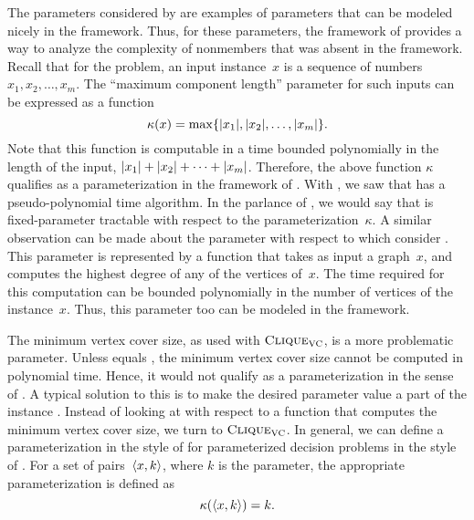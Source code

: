 The parameters considered by \citeauthor{garey1979computers} are examples of parameters that can be modeled nicely in the \citeauthor{flum2006parameterized} framework.
Thus, for these parameters, the framework of \citeauthor{flum2006parameterized} provides a way to analyze the complexity of nonmembers that was absent in the \citeauthor{downey1999parameterized} framework.
Recall that for the  problem, an input instance~$x$ is a sequence of numbers $x_1, x_2, \ldots, x_m$.
The \enquote{maximum component length} parameter for such inputs can be expressed as a function
\begin{equation*}
  \kappa(x) = \max \{{\lvert x_1\rvert}, {\lvert x_2\rvert}, \ldots, {\lvert x_m\rvert}\}.
\end{equation*}
Note that this function is computable in a time bounded polynomially in the length of the input, ${\lvert x_1\rvert} + {\lvert x_2\rvert} + \cdots + {\lvert x_m\rvert}$.
Therefore, the above function $\kappa$ qualifies as a parameterization in the framework of \citeauthor{flum2006parameterized}.
With \citeauthor{garey1979computers}, we saw that  has a pseudo-polynomial time algorithm.
In the parlance of \citeauthor{flum2006parameterized}, we would say that  is fixed-parameter tractable with respect to the parameterization~$\kappa$.
A similar observation can be made about the parameter with respect to which \citeauthor{garey1979computers} consider .
This parameter is represented by a function that takes as input a graph~$x$, and computes the highest degree of any of the vertices of~$x$.
The time required for this computation can be bounded polynomially in the number of vertices of the instance~$x$.
Thus, this parameter too can be modeled in the \citeauthor{flum2006parameterized} framework.

The minimum vertex cover size, as used with $\textnormal{\textsc{Clique}}_{\textnormal{\textsc{VC}}}$, is a more problematic parameter.
Unless  equals , the minimum vertex cover size cannot be computed in polynomial time.
Hence, it would not qualify as a parameterization in the sense of \citeauthor{flum2006parameterized}.
A typical solution to this is to make the desired parameter value a part of the instance \parencite[for instance][Section~15.2.4]{cygan2015parameterized}.
Instead of looking at  with respect to a function that computes the minimum vertex cover size, we turn to $\textnormal{\textsc{Clique}}_{\textnormal{\textsc{VC}}}$.
In general, we can define a parameterization in the style of \citeauthor{flum2006parameterized} for parameterized decision problems in the style of \citeauthor{downey1999parameterized}.
For a set of pairs~${\langle x, k\rangle}$, where $k$ is the parameter, the appropriate parameterization is defined as
\begin{equation}
\label{eq:parameterization}
  \kappa({\langle x, k\rangle}) = k.
\end{equation}

